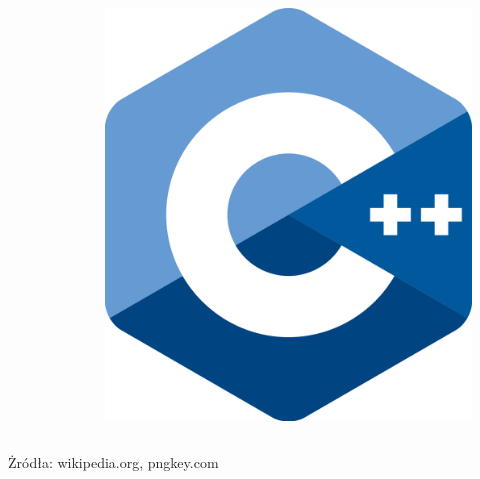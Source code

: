 \begin{frame}
\begin{columns}
\begin{column}{0.25\textwidth}
\begin{figure}
\begin{center}
				\end{center}
			\end{figure}
		\end{column}
		\begin{column}{0.25\textwidth}  %
						\begin{figure}
				\begin{center}
					\includegraphics[width=\textwidth]{img/C++_Logo.png}
				\end{center}
			\end{figure}
		\end{column}
	\end{columns}
\footnotesize{Żródła: wikipedia.org, pngkey.com}
\end{frame}

